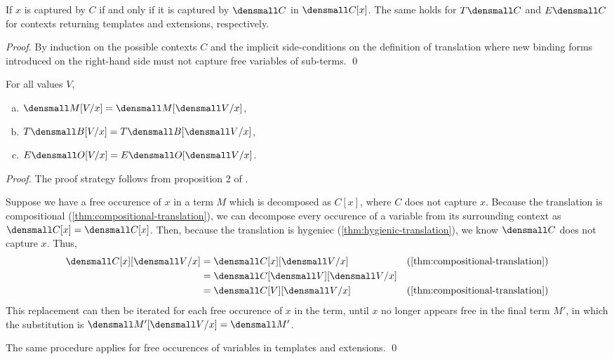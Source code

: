 \begin{lemma}[Hygiene]
  \label{thm:hygienic-translation}

  If $x$ is captured by $C$ if and only if it is captured by $\den{C}$ in $\den{C}{[x]}$.
  The same holds for $T\den{C}$ and $E\den{C}$ for contexts returning templates and extensions, respectively.
\end{lemma}
\begin{proof}
  By induction on the possible contexts $C$ and the implicit side-conditions on the definition of translation where new binding forms introduced on the right-hand side must not capture free variables of sub-terms.
  \qed
\end{proof}

\begin{lemma}[Substitution]
  \label{thm:substitution-translation}
  For all values $V$,
  \begin{enumerate}[(a)]
  \item $\den{M\subst{x}{V}} = \den{M}\subst{x}{\den{V}}$,
  \item $T\den{B\subst{x}{V}} = T\den{B}\subst{x}{\den{V}}$,
  \item $E\den{O\subst{x}{V}} = E\den{O}\subst{x}{\den{V}}$.
  \end{enumerate}
\end{lemma}
\begin{proof}
  The proof strategy follows from proposition 2 of \cite{DownenAriola2014CSCC}.

  Suppose we have a free occurence of $x$ in a term $M$ which is decomposed as $C[x]$, where $C$ does not capture $x$.
  Because the translation is compositional (\cref{thm:compositional-translation}), we can decompose every occurence of a variable from its surrounding context as $\den{C[x]} = \den{C}{[x]}$.
  Then, because the translation is hygeniec (\cref{thm:hygienic-translation}), we know $\den{C}$ does not capture $x$.
  Thus,
  \begin{align*}
    \den{C[x]}\subst{x}{\den{V}}
    &=
    \den{C}{[x]}\subst{x}{\den{V}}
    &(\cref{thm:compositional-translation})
    \\
    &=
    \den{C}{[\den{V}]}\subst{x}{\den{V}}
    \\
    &=
    \den{C[V]}\subst{x}{\den{V}}
    &(\cref{thm:compositional-translation})
  \end{align*}
  This replacement can then be iterated for each free occurence of $x$ in the term, until $x$ no longer appears free in the final term $M'$, in which the substitution is $\den{M'}\subst{x}{\den{V}} = \den{M'}$.

  The same procedure applies for free occurences of variables in templates and extensions.
  \qed
\end{proof}

